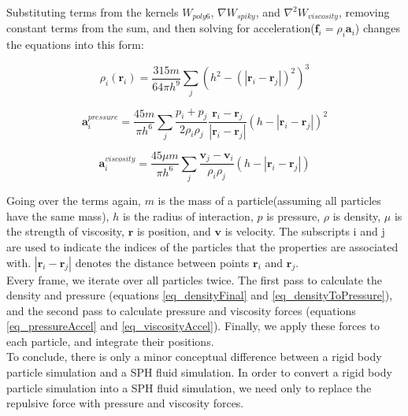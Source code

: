 \documentclass[]{article}
\begin{document}
	Substituting terms from the kernels \(W_{poly6}\), \(\nabla W_{spiky}\), and \(  \nabla ^ 2 W_{viscosity}\), 
	removing constant terms from the sum, and then solving for acceleration(\( \mathbf{f}_i = \rho_i \mathbf{a}_i \)) 
	changes the equations into this form:
	
	\begin{equation}
		\label{eq_densityFinal}
		\rho_i (\mathbf{r}_i) = \frac{315m}{64 \pi h^9 } \sum_{j}^{} (h^2 - (|\mathbf{r}_i - \mathbf{r}_j|)^2 )^3
	\end{equation}
	
	\begin{equation}
		\label{eq_pressureAccel}
		\mathbf{a}_{i}^{pressure} =  \frac{45 m}{\pi h^6}  \sum_{j}^{} \frac{p_i + p_j}{2 \rho_i \rho_j} 
		 \frac{\mathbf{r}_i - \mathbf{r}_j}{|\mathbf{r}_i - \mathbf{r}_j|} (h - |\mathbf{r}_i - \mathbf{r}_j|)^2 
	\end{equation}
	
	\begin{equation}
		\label{eq_viscosityAccel}
		\mathbf{a}_{i}^{viscosity} = \frac{45 \mu m}{\pi h^6} \sum_{j}^{} \frac{ \mathbf{v}_j - \mathbf{v}_i}{ \rho_i \rho_j} (h - |\mathbf{r}_i - \mathbf{r}_j|)
	\end{equation}
	
	Going over the terms again, \(m\) is the mass of a particle(assuming all particles have the same mass), \(h\) is the 
	radius of interaction, \(p\) is pressure, \(\rho\) is density, \(\mu\) is the strength of viscosity, \(\mathbf{r}\) 
	is position, and \(\mathbf{v}\) is velocity. The subscripts i and j are used to indicate the indices of the particles
	that the properties are associated with. \(|\mathbf{r}_i - \mathbf{r}_j|\) denotes the distance between points 
	\(\mathbf{r}_i\) and \(\mathbf{r}_j\). \\
	
	Every frame, we iterate over all particles twice. The first pass to calculate the density and pressure (equations 
	\ref{eq_densityFinal} and \ref{eq_densityToPressure}), and the second pass to calculate pressure and viscosity forces
	(equations \ref{eq_pressureAccel} and \ref{eq_viscosityAccel}). Finally, we apply these forces to each particle, 
	and integrate their positions.\\
	
	To conclude, there is only a minor conceptual difference between a rigid body particle simulation and a SPH fluid 
	simulation. In order to convert a rigid body particle simulation into a SPH fluid simulation, we need only to 
	replace the repulsive force with pressure and viscosity forces.\\
	
\end{document}

